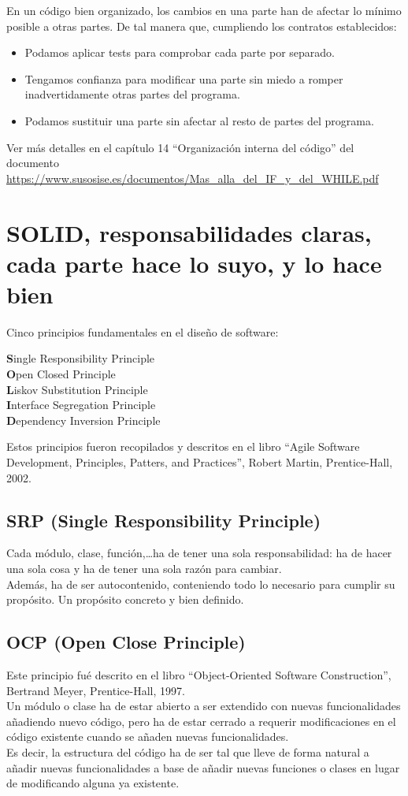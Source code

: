 \documentclass[spanish,12pt,a4paper,final,oneside]{book}
\begin{document}
En un código bien organizado, los cambios en una parte han de afectar lo mínimo posible a otras partes. De tal manera que, cumpliendo los contratos establecidos:
\begin{itemize}
\item Podamos aplicar tests para comprobar cada parte por separado.
\item Tengamos confianza para modificar una parte sin miedo a romper inadvertidamente otras partes del programa.
\item Podamos sustituir una parte sin afectar al resto de partes del programa.
\end{itemize}

Ver más detalles en el capítulo 14 ``Organización interna del código'' del documento \url{https://www.susosise.es/documentos/Mas_alla_del_IF_y_del_WHILE.pdf}


\section{SOLID, responsabilidades claras, cada parte hace lo suyo, y lo hace bien}
Cinco principios fundamentales en el diseño de software:

\textbf{S}ingle Responsibility Principle
\\ \textbf{O}pen Closed Principle
\\ \textbf{L}iskov Substitution Principle
\\ \textbf{I}nterface Segregation Principle
\\ \textbf{D}ependency Inversion Principle

Estos principios fueron recopilados y descritos en el libro ``Agile Software Development, Principles, Patters, and Practices'', Robert Martin, Prentice-Hall, 2002.

\subsection{\textbf{S}RP (Single Responsibility Principle)}
Cada módulo, clase, función,\ldots ha de tener una sola responsabilidad: ha de hacer una sola cosa y ha de tener una sola razón para cambiar.
\\Además, ha de ser autocontenido, conteniendo todo lo necesario para cumplir su propósito. Un propósito concreto y bien definido.

\subsection{\textbf{O}CP (Open Close Principle)}
Este principio fué descrito en el libro ``Object-Oriented Software Construction'', Bertrand Meyer, Prentice-Hall, 1997.
\\Un módulo o clase ha de estar abierto a ser extendido con nuevas funcionalidades añadiendo nuevo código, pero ha de estar cerrado a requerir modificaciones en el código existente cuando se añaden nuevas funcionalidades.
\\Es decir, la estructura del código ha de ser tal que lleve de forma natural a añadir nuevas funcionalidades a base de añadir nuevas funciones o clases en lugar de modificando alguna ya existente.
\end{document}
